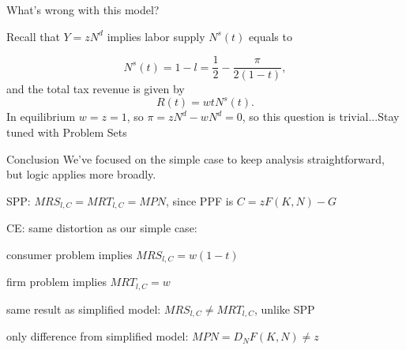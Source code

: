 \documentclass[11pt,aspectratio=169,usenames,dvipsnames]{beamer}
\let\tempone\itemize
\let\temptwo\enditemize
\renewenvironment{itemize}{\tempone\addtolength{\itemsep}{\fill}}{\temptwo}
\begin{document}
\begin{frame}{What's wrong with this model?}
\label{slide:What_s_wrong_with_this_model_}

Recall that $ Y = z N^{d} $ implies labor supply $ N^{s}(t) $ equals to

%
\begin{equation}
\label{eq:laborSupplyTaxRate}
    N^{s}(t) = 1 - l = \frac{1}{2} - \frac{\pi}{2(1-t)}
,\end{equation}
%
and the total tax revenue is given by
%
\begin{equation}
\label{eq:govTaxRevenue}
    R(t) = w t N^{s}(t)
.\end{equation}
%
In equilibrium $ w = z = 1 $, so $ \pi = z N^{d} - w N^{d} = 0 $, so this question is trivial...Stay tuned with Problem Sets \faSmileWink[regular]

\end{frame}

\begin{frame}{Conclusion}
\label{slide:Conclusion}
    We've focused on the simple case to keep analysis straightforward, but logic applies more broadly.
    \begin{itemize}
        \item SPP: $ MRS_{l, C} = MRT_{l, C} = MPN $, since PPF is $ C = z F( K, N ) - G $
        \item CE: same distortion as our simple case:
        \begin{itemize}
            \item consumer problem implies $ MRS_{l, C} = w ( 1-t ) $
            \item firm problem implies $ MRT_{l, C} = w $
            \item same result as simplified model: $ MRS_{l, C} \neq MRT_{l, C} $, unlike SPP
            \item only difference from simplified model: $ MPN = D_{N}F( K, N ) \neq z $
        \end{itemize}
    \end{itemize}
\end{frame}
\end{document}
